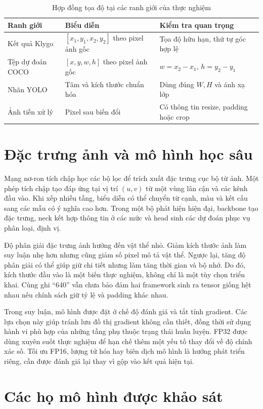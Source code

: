 \begin{table}[H]\centering\small
\caption{Hợp đồng tọa độ tại các ranh giới của thực nghiệm}
\begin{tabularx}{\textwidth}{p{3cm}YY}
\toprule Ranh giới & Biểu diễn & Kiểm tra quan trọng \\\midrule
Kết quả Klygo & $[x_1,y_1,x_2,y_2]$ theo pixel ảnh gốc & Tọa độ hữu hạn, thứ tự góc hợp lệ \\
Tệp dự đoán COCO & $[x,y,w,h]$ theo pixel ảnh gốc & $w=x_2-x_1$, $h=y_2-y_1$ \\
Nhãn YOLO & Tâm và kích thước chuẩn hóa & Dùng đúng $W,H$ và ánh xạ lớp \\
Ảnh tiền xử lý & Pixel sau biến đổi & Có thông tin resize, padding hoặc crop \\
\bottomrule
\end{tabularx}
\end{table}

\section{Đặc trưng ảnh và mô hình học sâu}
Mạng nơ-ron tích chập học các bộ lọc để trích xuất đặc trưng cục bộ từ ảnh. Một phép tích chập tạo đáp ứng tại vị trí $(u,v)$ từ một vùng lân cận và các kênh đầu vào. Khi xếp nhiều tầng, biểu diễn có thể chuyển từ cạnh, màu và kết cấu sang các mẫu có ý nghĩa cao hơn. Trong một bộ phát hiện hiện đại, backbone tạo đặc trưng, neck kết hợp thông tin ở các mức và head sinh các dự đoán phục vụ phân loại, định vị.

Độ phân giải đặc trưng ảnh hưởng đến vật thể nhỏ. Giảm kích thước ảnh làm suy luận nhẹ hơn nhưng cũng giảm số pixel mô tả vật thể. Ngược lại, tăng độ phân giải có thể giúp giữ chi tiết nhưng làm tăng thời gian và bộ nhớ. Do đó, kích thước đầu vào là một biến thực nghiệm, không chỉ là một tùy chọn triển khai. Cùng ghi ``640'' vẫn chưa bảo đảm hai framework sinh ra tensor giống hệt nhau nếu chính sách giữ tỷ lệ và padding khác nhau.

Trong suy luận, mô hình được đặt ở chế độ đánh giá và tắt tính gradient. Các lựa chọn này giúp tránh lưu đồ thị gradient không cần thiết, đồng thời sử dụng hành vi phù hợp của những tầng phụ thuộc trạng thái huấn luyện. FP32 được dùng xuyên suốt thực nghiệm để hạn chế thêm một yếu tố thay đổi về độ chính xác số. Tối ưu FP16, lượng tử hóa hay biên dịch mô hình là hướng phát triển riêng, cần được đánh giá lại thay vì gộp vào kết quả hiện tại.

\section{Các họ mô hình được khảo sát}
